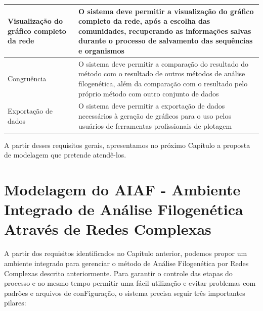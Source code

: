 \begin{table}
\begin{tabular}{p{5cm}p{10cm}}
Visualização do gráfico completo da rede & O sistema deve permitir a visualização do gráfico completo da rede, após a escolha das comunidades,
recuperando as informações salvas durante o processo de salvamento das sequências e organismos \\ \hline
Congruência & O sistema deve permitir a comparação do resultado do método com o resultado de outros métodos de análise filogenética, além da comparação
com o resultado pelo próprio método com outro conjunto de dados \\ \hline
Exportação de dados & O sistema deve permitir a exportação de dados necessários à geração de gráficos para o uso pelos usuários de ferramentas
profissionais de plotagem \\ \hline
\end{tabular}
\label{tab:requisitos}
\end{table} 

A partir desses requisitos gerais, apresentamos no próximo Capítulo a proposta de modelagem que pretende atendê-los.


\chapter{Modelagem do AIAF - Ambiente Integrado de Análise Filogenética Através de Redes Complexas}
\label{cap:navi}


A partir dos requisitos identificados no Capítulo anterior, podemos propor um ambiente integrado para gerenciar o método de Análise Filogenética por
Redes Complexas descrito anteriormente. Para garantir o controle das etapas do processo e ao mesmo tempo permitir uma fácil utilização e evitar problemas
com padrões e arquivos de conFiguração, o sistema precisa seguir três importantes pilares:

